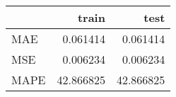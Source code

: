 \begin{tabular}{lrr}
\toprule
{} &      train &       test \\
\midrule
MAE  &   0.061414 &   0.061414 \\
MSE  &   0.006234 &   0.006234 \\
MAPE &  42.866825 &  42.866825 \\
\bottomrule
\end{tabular}
